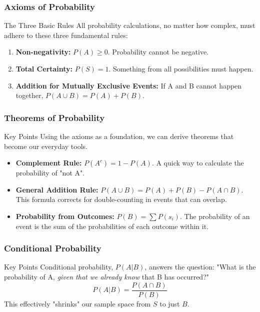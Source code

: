 \begin{frame}[t]
\frametitle{Axioms of Probability}
    \begin{block}{The Three Basic Rules}
        All probability calculations, no matter how complex, must adhere to these three fundamental rules:
        \begin{enumerate}
            \item \textbf{Non-negativity:} $P(A) \ge 0$. Probability cannot be negative.
            \item \textbf{Total Certainty:} $P(S) = 1$. Something from all possibilities must happen.
            \item \textbf{Addition for Mutually Exclusive Events:} If A and B cannot happen together, $P(A \cup B) = P(A) + P(B)$.
        \end{enumerate}
    \end{block}
\end{frame}

\begin{frame}[t]
\frametitle{Theorems of Probability}
    \begin{block}{Key Points}
        Using the axioms as a foundation, we can derive theorems that become our everyday tools.
        \begin{itemize}
            \item \textbf{Complement Rule:} $P(A^c) = 1 - P(A)$. A quick way to calculate the probability of "not A".
            \item \textbf{General Addition Rule:} $P(A \cup B) = P(A) + P(B) - P(A \cap B)$. This formula corrects for double-counting in events that can overlap.
            \item \textbf{Probability from Outcomes:} $P(B) = \sum P(s_i)$. The probability of an event is the sum of the probabilities of each outcome within it.
        \end{itemize}
    \end{block}
\end{frame}

\begin{frame}[t]
\frametitle{Conditional Probability}
    \begin{block}{Key Points}
        Conditional probability, $P(A|B)$, answers the question: "What is the probability of A, \textit{given that we already know} that B has occurred?"
        \[ P(A|B) = \frac{P(A \cap B)}{P(B)} \]
        This effectively "shrinks" our sample space from $S$ to just $B$.
    \end{block}
\end{frame}

